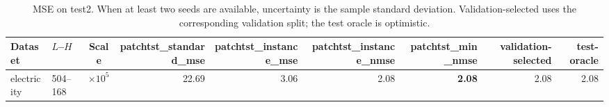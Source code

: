 \begin{table}[htbp]
\centering
\caption{MSE on test2. When at least two seeds are available, uncertainty is the sample standard deviation. Validation-selected uses the corresponding validation split; the test oracle is optimistic.}
\begin{tabular}{llcrrrrr|r}
\toprule
Dataset & $L$--$H$ & Scale & patchtst\_standard\_mse & patchtst\_instance\_mse & patchtst\_instance\_nmse & patchtst\_min\_nmse & validation-selected & test-oracle \\
\midrule
electricity & 504--168 & $\times 10^{5}$ & 22.69 & 3.06 & 2.08 & \textbf{2.08} & 2.08 & 2.08 \\
\bottomrule
\end{tabular}
\end{table}
